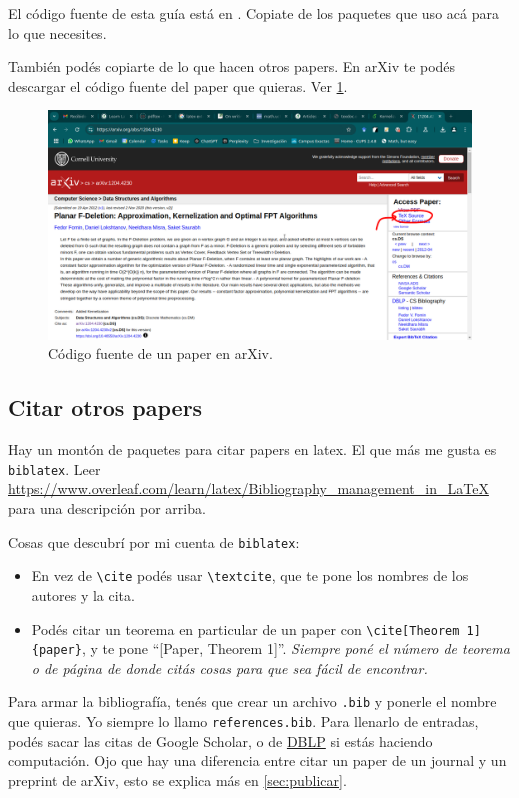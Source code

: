 \documentclass{article}
\begin{document}
El código fuente de esta guía está en . Copiate de los paquetes que uso acá para lo que necesites.

También podés copiarte de lo que hacen otros papers. En arXiv te podés descargar el código fuente del paper que quieras. Ver \cref{fig:tex-source-en-arXiv}.

\begin{figure}[ht]
\centering
\includegraphics[width=\textwidth]{img/tex-source-en-arXiv.png}
\caption{Código fuente de un paper en arXiv.}
\label{fig:tex-source-en-arXiv}
\end{figure}

\subsection{Citar otros papers}
Hay un montón de paquetes para citar papers en latex. El que más me gusta es \texttt{biblatex}. Leer \url{https://www.overleaf.com/learn/latex/Bibliography_management_in_LaTeX} para una descripción por arriba.

Cosas que descubrí por mi cuenta de \texttt{biblatex}:
\begin{itemize}
\item En vez de \verb|\cite| podés usar \verb|\textcite|, que te pone los nombres de los autores y la cita.
\item Podés citar un teorema en particular de un paper con \verb|\cite[Theorem 1]{paper}|, y te pone ``[Paper, Theorem 1]''. \emph{Siempre poné el número de teorema o de página de donde citás cosas para que sea fácil de encontrar.}
\end{itemize}

Para armar la bibliografía, tenés que crear un archivo \texttt{.bib} y ponerle el nombre que quieras. Yo siempre lo llamo \texttt{references.bib}. Para llenarlo de entradas, podés sacar las citas de Google Scholar, o de \href{https://dblp.org/}{DBLP} si estás haciendo computación. Ojo que hay una diferencia entre citar un paper de un journal y un preprint de arXiv, esto se explica más en \cref{sec:publicar}.
\end{document}
